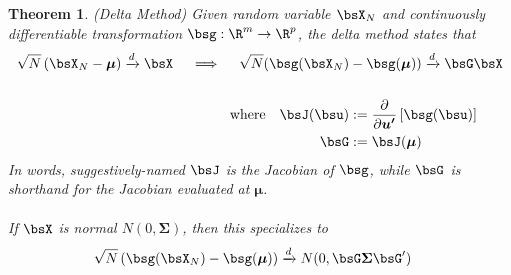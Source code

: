 \documentclass[12pt]{article}
\theoremstyle{plain}
\newtheorem{thm}{Theorem}[section]
\theoremstyle{definition}
\theoremstyle{remark}
\newcommand{\bsmu}{\boldsymbol{\mu}}
\newcommand{\bsSigma}{\boldsymbol{\Sigma}}
\newcommand{\bsup}{\boldsymbol{u'}}
\newcommand{\dto}{\xrightarrow{d}}
\begin{document}
\begin{thm}\emph{(Delta Method)}
Given random variable $\bsX_N$ and continuously differentiable
transformation $\bsg:\R^m\rightarrow \R^p$, the \emph{delta method}
states that
\begin{align*}
  \sqrt{N}\left(
  \bsX_N
  -\bsmu
  \right)
  \dto \bsX
  \quad\implies\quad
  \sqrt{N}(
  \bsg(\bsX_N)
  &-
  \bsg(\bsmu)
  )
  \dto
  \bsG \bsX
  \\\\
  \text{where}\quad
  \bsJ(\bsu)
  &:=\frac{\partial}{\partial \bsup}
  \left[\bsg(\bsu)\right]\\
  \bsG &:= \bsJ(\bsmu)
\end{align*}
In words, suggestively-named $\bsJ$ is the Jacobian of $\bsg$, while
$\bsG$ is shorthand for the Jacobian evaluated at $\bsmu$.
\\
\\
If $\bsX$ is normal $N(0,\bsSigma)$, then this specializes to
\begin{align*}
  \sqrt{N}\left(
  \bsg(\bsX_N)
  -
  \bsg(\bsmu)
  \right)
  &\xrightarrow{d}
  N(0,\bsG\bsSigma\bsG')
\end{align*}
\end{thm}
\end{document}
